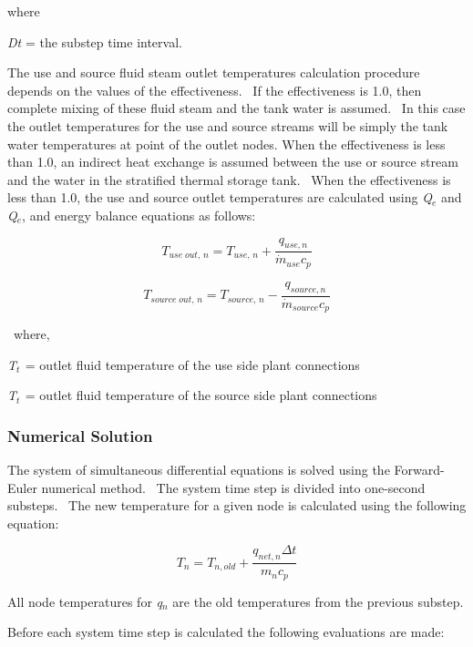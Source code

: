 where

\emph{Dt} = the substep time interval.

The use and source fluid steam outlet temperatures calculation procedure depends on the values of the effectiveness.~ If the effectiveness is 1.0, then complete mixing of these fluid steam and the tank water is assumed.~ In this case the outlet temperatures for the use and source streams will be simply the tank water temperatures at point of the outlet nodes. When the effectiveness is less than 1.0, an indirect heat exchange is assumed between the use or source stream and the water in the stratified thermal storage tank.~ When the effectiveness is less than 1.0, the use and source outlet temperatures are calculated using \emph{Q\(_{e}\)} and \emph{Q\(_{e}\)}, and energy balance equations as follows:

\begin{equation}
{T_{use\;out,\,n}} = {T_{use,\,n}} + \frac{{{q_{use,n}}}}{{{{\dot m}_{use}}{c_p}}}
\end{equation}

\begin{equation}
{T_{source\;out,\,n}} = {T_{source,\,n}} - \frac{{{q_{source,n}}}}{{{{\dot m}_{source}}{c_p}}}
\end{equation}

~where,

\emph{T\(_{t}\)}\(_{ }\) = outlet fluid temperature of the use side plant connections

\emph{T\(_{t}\)}\(_{ }\) = outlet fluid temperature of the source side plant connections

\subsubsection{Numerical Solution}\label{numerical-solution}

The system of simultaneous differential equations is solved using the Forward-Euler numerical method.~ The system time step is divided into one-second substeps.~ The new temperature for a given node is calculated using the following equation:

\begin{equation}
{T_n} = {T_{n,old}} + \frac{{{q_{net,n}}\Delta t}}{{{m_n}{c_p}}}
\end{equation}

All node temperatures for \emph{q\(_{n}\)} are the old temperatures from the previous substep.

Before each system time step is calculated the following evaluations are made:

